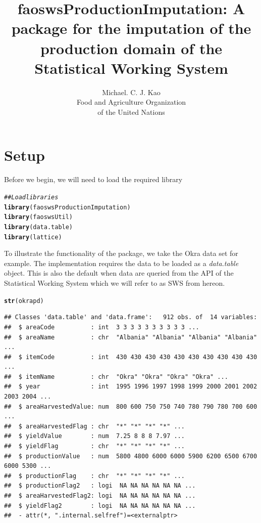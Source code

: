 \documentclass[nojss]{jss}\usepackage[]{graphicx}\usepackage[]{color}
\title{\bf faoswsProductionImputation: A package for the imputation of
  the production domain of the Statistical Working System}
\author{Michael. C. J. Kao\\ Food and Agriculture Organization \\ of
  the United Nations}
\makeatletter
\newcommand{\hlcom}[1]{\textcolor[rgb]{0.678,0.584,0.686}{\textit{#1}}}%
\newcommand{\hlstd}[1]{\textcolor[rgb]{0.345,0.345,0.345}{#1}}%
\newcommand{\hlkwd}[1]{\textcolor[rgb]{0.737,0.353,0.396}{\textbf{#1}}}%
\newenvironment{kframe}{%
 \def\at@end@of@kframe{}%
 \ifinner\ifhmode%
  \def\at@end@of@kframe{\end{minipage}}%
  \begin{minipage}{\columnwidth}%
 \fi\fi%
 \def\FrameCommand##1{\hskip\@totalleftmargin \hskip-\fboxsep
 \colorbox{shadecolor}{##1}\hskip-\fboxsep
     \hskip-\linewidth \hskip-\@totalleftmargin \hskip\columnwidth}%
 \MakeFramed {\advance\hsize-\width
   \@totalleftmargin\z@ \linewidth\hsize
   \@setminipage}}%
 {\par\unskip\endMakeFramed%
 \at@end@of@kframe}
\newenvironment{knitrout}{}{} %
\makeatother
\begin{document}
\section{Setup}


Before we begin, we will need to load the required library

\begin{knitrout}
\color{fgcolor}\begin{kframe}
\begin{alltt}
\hlcom{## Load libraries}
\hlkwd{library}\hlstd{(faoswsProductionImputation)}
\hlkwd{library}\hlstd{(faoswsUtil)}
\hlkwd{library}\hlstd{(data.table)}
\hlkwd{library}\hlstd{(lattice)}
\end{alltt}
\end{kframe}
\end{knitrout}



To illustrate the functionality of the package, we take the Okra data
set for example. The implementation requires the data to be loaded as
a \textit{data.table} object. This is also the default when data are
queried from the API of the Statistical Working System which we will
refer to as SWS from hereon.

\begin{knitrout}
\color{fgcolor}\begin{kframe}
\begin{alltt}
\hlkwd{str}\hlstd{(okrapd)}
\end{alltt}
\begin{verbatim}
## Classes 'data.table' and 'data.frame':	912 obs. of  14 variables:
##  $ areaCode          : int  3 3 3 3 3 3 3 3 3 3 ...
##  $ areaName          : chr  "Albania" "Albania" "Albania" "Albania" ...
##  $ itemCode          : int  430 430 430 430 430 430 430 430 430 430 ...
##  $ itemName          : chr  "Okra" "Okra" "Okra" "Okra" ...
##  $ year              : int  1995 1996 1997 1998 1999 2000 2001 2002 2003 2004 ...
##  $ areaHarvestedValue: num  800 600 750 750 740 780 790 780 700 600 ...
##  $ areaHarvestedFlag : chr  "*" "*" "*" "*" ...
##  $ yieldValue        : num  7.25 8 8 8 7.97 ...
##  $ yieldFlag         : chr  "*" "*" "*" "*" ...
##  $ productionValue   : num  5800 4800 6000 6000 5900 6200 6500 6700 6000 5300 ...
##  $ productionFlag    : chr  "*" "*" "*" "*" ...
##  $ productionFlag2   : logi  NA NA NA NA NA NA ...
##  $ areaHarvestedFlag2: logi  NA NA NA NA NA NA ...
##  $ yieldFlag2        : logi  NA NA NA NA NA NA ...
##  - attr(*, ".internal.selfref")=<externalptr>
\end{verbatim}
\end{kframe}
\end{knitrout}
\end{document}
